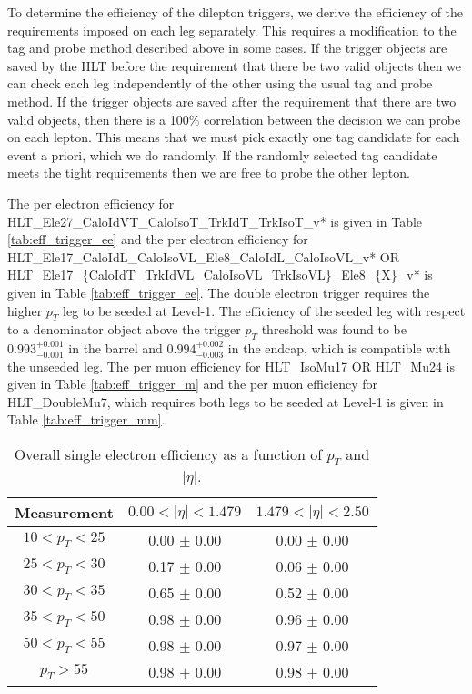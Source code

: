  
To determine the efficiency of the dilepton triggers, 
we derive the efficiency of the requirements imposed on each leg separately.
This requires a modification to the tag and probe method described above in some cases.
If the trigger objects are saved by the HLT before the requirement that there be two valid objects then
we can check each leg independently of the other using the usual tag and probe method.
If the trigger objects are saved after the requirement that there are two valid objects, then there is 
a 100\% correlation between the decision we can probe on each lepton.
This means that we must pick exactly one tag candidate for each event a priori, which we do 
randomly. 
If the randomly selected tag candidate meets the tight requirements then we are free to 
probe the other lepton.

The per electron efficiency for
HLT\_Ele27\_CaloIdVT\_CaloIsoT\_TrkIdT\_TrkIsoT\_v*
is given in Table \ref{tab:eff_trigger_ee}
and the per electron efficiency for 
HLT\_Ele17\_CaloIdL\_CaloIsoVL\_Ele8\_CaloIdL\_CaloIsoVL\_v* OR
HLT\_Ele17\_\{CaloIdT\_TrkIdVL\_CaloIsoVL\_TrkIsoVL\}\_Ele8\_\{X\}\_v*
is given in Table \ref{tab:eff_trigger_ee}.
The double electron trigger requires the higher $p_T$ leg to be seeded at Level-1.
The efficiency of the seeded leg with respect to a denominator object above the
trigger $p_T$ threshold was found to be $0.993^{+0.001}_{-0.001}$ in the barrel and
$0.994^{+0.002}_{-0.003}$ in the endcap, which is compatible with the unseeded leg.
The per muon efficiency for
HLT\_IsoMu17 OR HLT\_Mu24
is given in Table \ref{tab:eff_trigger_m}
and the per muon efficiency for HLT\_DoubleMu7, which requires both legs to be seeded
at Level-1 is
given in Table \ref{tab:eff_trigger_mm}.
\vspace{10pt}
\begin{table}[!ht]
\begin{center}
\begin{tabular}{c|c|c}
\hline
Measurement  & $0.00<|\eta|<1.479$  & $1.479<|\eta|<2.50$  \\ 
\hline
$  10<p_T<  25$ & 0.00 $\pm$ 0.00  & 0.00 $\pm$ 0.00  \\ \hline 
$  25<p_T<  30$ & 0.17 $\pm$ 0.00  & 0.06 $\pm$ 0.00  \\ \hline 
$  30<p_T<  35$ & 0.65 $\pm$ 0.00  & 0.52 $\pm$ 0.00  \\ \hline 
$  35<p_T<  50$ & 0.98 $\pm$ 0.00  & 0.96 $\pm$ 0.00  \\ \hline 
$  50<p_T<  55$ & 0.98 $\pm$ 0.00  & 0.97 $\pm$ 0.00  \\ \hline 
$  p_T>     55$ & 0.98 $\pm$ 0.00  & 0.98 $\pm$ 0.00  \\ \hline 
\end{tabular}
\caption{Overall single electron efficiency as a function of $p_T$ and $|\eta|$.}
\label{tab:eff_trigger_e}
\end{center}
\end{table}
